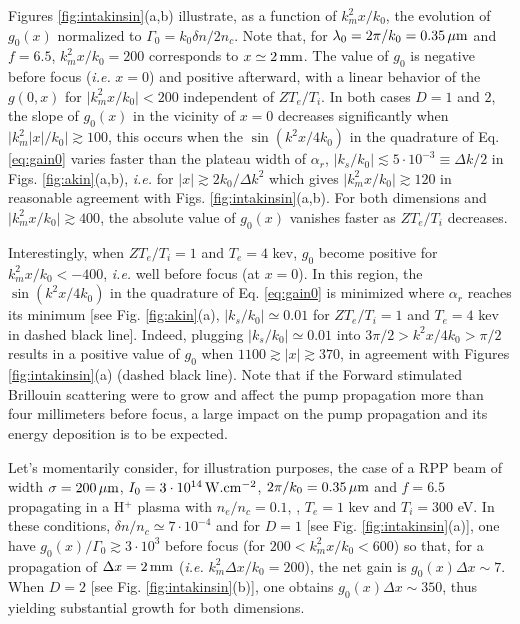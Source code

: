 \documentclass[
 reprint,
 amsmath,amssymb,
 aps,
]{revtex4-1}
\begin{document}
Figures \ref{fig:intakinsin}(a,b) illustrate, as a function of $k_m^2 x /k_0$, the evolution of $g_0(x)$
normalized to $\Gamma_0=k_0\delta n / 2n_c$. Note that, for $\lambda_0=2\pi/k_0=0.35\,\rm\mu m$ and $f=6.5$,  $k_m^2 x /k_0=200$ corresponds to $x\simeq 2\,\rm mm$. 
The value of $g_0$ is negative before focus (\emph{i.e.} $x=0$) and positive afterward, with  a linear behavior of the $g(0,x)$ for  $\vert k_m^2 x /k_0 \vert < 200$  independent of $ZT_e/T_i$. In both cases $D=1$ and $2$, the slope of $g_0(x)$  in the vicinity of $x=0$   decreases significantly when   $\vert k_m^2 \vert x\vert /k_0 \vert \gtrsim 100$, this occurs when the $\sin(k^2x/4k_0)$ in the quadrature of Eq. \eqref{eq:gain0} varies faster than the plateau width of $\alpha_r$, $\vert k_s/k_0\vert \lesssim 5\cdot 10^{-3}\equiv \Delta k /2$ in Figs. \ref{fig:akin}(a,b), \emph{i.e.} for $\vert x\vert \gtrsim 2k_0/\Delta k^2$ which gives $\vert k_m^2x/k_0 \vert  \gtrsim 120  $ in reasonable  agreement with Figs. \ref{fig:intakinsin}(a,b).
For both dimensions and$\vert k_m^2 x /k_0 \vert \gtrsim 400$, the absolute value of $g_0(x)$ vanishes faster as $ZT_e/T_i$ decreases. 

Interestingly, when $ZT_e/T_i=1$ and $T_e=4$ kev, $g_0$ become positive for $k_m^2x/k_0<-400$, \emph{i.e.} well before focus (at $x=0$). In this region,  the $\sin(k^2x/4k_0)$ in the quadrature of Eq. \eqref{eq:gain0} is minimized   where $\alpha_r$ reaches its minimum [see Fig. \ref{fig:akin}(a), $\vert k_s/k_0\vert \simeq 0.01$ for $ZT_e/T_i=1$ and $T_e=4$ kev in dashed black line]. Indeed, plugging  $\vert k_s/k_0\vert \simeq 0.01$ into $3\pi/2>k^2x/4k_0>\pi/2$ results in a positive value of $g_0$  when $1100\gtrsim \vert x\vert\gtrsim 370$, in agreement with Figures \ref{fig:intakinsin}(a) (dashed black line).
Note that if the Forward stimulated Brillouin  scattering were to grow   and affect the pump propagation more than four millimeters before focus, a large impact on the pump propagation and its energy deposition is to be expected. 

Let's momentarily consider, for illustration purposes,  the  case of a RPP beam of width $\sigma =200\,\rm\mu m$, $I_0=3\cdot 10^{14} \,\rm W.cm^{-2}$, $2\pi/k_0 = 0.35\,\rm\mu m$ and $f = 6.5$ propagating in a H$^{+}$ plasma with $n_e/n_c=0.1$, , $T_e=1$ kev and $T_i=300$ eV. In these conditions, $\delta n/n_c \simeq 7\cdot 10^{-4}$ and  for $D=1$ [see Fig. \ref{fig:intakinsin}(a)], one have $g_0(x)/\Gamma_0 \gtrsim 3\cdot 10^3$ before focus (for $200< k_m^2 x/k_0 < 600$) so that, for  a propagation of $\Delta x = 2\,\rm mm$ (\emph{i.e.} $k_m^2 \Delta x/k_0 = 200$), the net gain is $g_0(x)\Delta x\sim 7 $. When $D=2$ [see Fig. \ref{fig:intakinsin}(b)], one obtains $g_0(x)\Delta x\sim 350 $, thus yielding substantial growth for both dimensions.
\end{document}
